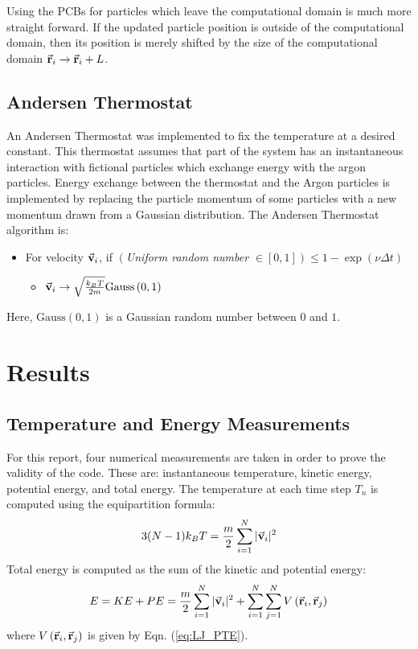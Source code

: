 \documentclass[12pt,oneside,a4paper]{article}
\newcommand{\br}{\vec {\bf r}}
\newcommand{\bv}{\vec {\bf v}}
\newcommand{\dt}{\Delta t}
\begin{document}
Using the PCBs for particles which leave the computational domain is much more straight forward.  If the updated particle position is outside of the computational domain, then its position is merely shifted by the size of the computational domain $\br_i \rightarrow \br_i + L$.

\subsection{Andersen Thermostat}

An Andersen Thermostat was implemented to fix the temperature at a desired constant.  This thermostat assumes that part of the system has an instantaneous interaction with fictional particles which exchange energy with the argon particles.  Energy exchange between the thermostat and the Argon particles is implemented by replacing the particle momentum of some particles with a new momentum drawn from a Gaussian distribution.  The Andersen Thermostat algorithm is:
\begin{itemize}
	\item For velocity $\bv_i$, if $\left(\right.$\emph{Uniform random number} $\left.\in \left[0, 1\right] \right) \leq 1-\exp\left(\nu \dt\right)$
	\begin{itemize}
		\item $\bv_i \rightarrow \sqrt{\frac{k_B T}{2 m}} \text{Gauss}\left(0, 1\right)$
	\end{itemize}
\end{itemize}
Here, $\text{Gauss}\left(0, 1\right)$ is a Gaussian random number between $0$ and $1$.

\section{Results}

\subsection{Temperature and Energy Measurements}

For this report, four numerical measurements are taken in order to prove the validity of the code.  These are:  instantaneous temperature, kinetic energy, potential energy, and total energy.  The temperature at each time step $T_n$ is computed using the equipartition formula:
\begin{equation}
3(N-1)k_B T = \frac{m}{2}\sum\limits_{i=1}^{N}|\bv_i|^2
\end{equation}
Total energy is computed as the sum of the kinetic and potential energy:
\begin{equation}
E = KE + PE = \frac{m}{2}\sum\limits_{i=1}^{N}|\bv_i|^2 + \sum\limits_{i=1}^{N}\sum\limits_{j=1}^{N} V\left(\br_i, \br_j\right)
\end{equation}
where $V\left(\br_i, \br_j\right)$ is given by Eqn. (\ref{eq:LJ_PTE}).
\end{document}
